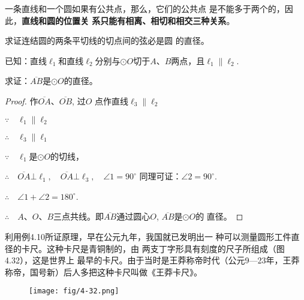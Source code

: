 一条直线和一个圆如果有公共点，那么，它们的公共点
是不能多于两个的，因此，\textbf{直线和圆的位置关
系只能有相离、相切和相交三种关系}。





\begin{example}
    求证连结圆的两条平切线的切点间的弦必是圆
的直径。

已知：直线$\ell_1$和直线$\ell_2$分别与$\odot O$切于$A$、$B$两点，且$\ell_1\parallel \ell_2$.

求证：$\overline{AB}$是$\odot O$的直径。
\end{example}

\begin{figure}[htp]
    \centering
{}
    \caption{}
\end{figure}

\begin{proof}
    作$\overline{OA}$、$\overline{OB}$, 过$O$
点作直线$\ell_3\parallel \ell_2$

$\because\quad \ell_1\parallel \ell_2$

$\therefore\quad \ell_3\parallel \ell_1$

$\because\quad \ell_1$是$\odot O$的切线，

$\therefore\quad \overline{OA}\bot \ell_1,\quad \overline{OA}\bot \ell_3,\quad \angle 1=90^{\circ}$
同理可证：$\angle 2=90^{\circ}$.

$\therefore\quad \angle 1+\angle 2=180^{\circ}$.

$\therefore\quad A$、$O$、$B$三点共线。即$\overline{AB}$通过圆心$O$, $\overline{AB}$是$\odot O$的
直径。
\end{proof}


利用例4.10所证原理，早在公元九年，我国就已发明出一
种可以测量圆形工件直径的卡尺。这种卡尺是青铜制的，由
两支丁字形具有刻度的尺子所组成（图4.32），这是世界上
最早的卡尺。由于当时是王莽称帝时代（公元9—23年，王莽
称帝，国号新）后人多把这种卡尺叫做《王莽卡尺》。
\begin{figure}[htp]
    \centering
\texttt{[image: fig/4-32.png]}
    \caption{}
\end{figure}

